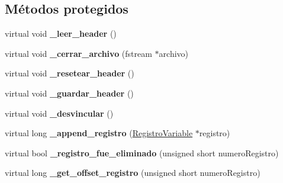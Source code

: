 \subsection*{\-Métodos protegidos}
\begin{DoxyCompactItemize}
\item 
\hypertarget{class_manejador_registros_variables_ac60f3d3598c66d062b872c2fea30bc29}{virtual void {\bfseries \-\_\-leer\-\_\-header} ()}\label{class_manejador_registros_variables_ac60f3d3598c66d062b872c2fea30bc29}

\item 
\hypertarget{class_manejador_registros_variables_a172152a530dbae43af2d83aa8cbdaa88}{virtual void {\bfseries \-\_\-cerrar\-\_\-archivo} (fstream $\ast$archivo)}\label{class_manejador_registros_variables_a172152a530dbae43af2d83aa8cbdaa88}

\item 
\hypertarget{class_manejador_registros_variables_a2ba9a32df31b43fbdf821921c27b9459}{virtual void {\bfseries \-\_\-resetear\-\_\-header} ()}\label{class_manejador_registros_variables_a2ba9a32df31b43fbdf821921c27b9459}

\item 
\hypertarget{class_manejador_registros_variables_a8022d09ab67fe22c33412bedd87abb6b}{virtual void {\bfseries \-\_\-guardar\-\_\-header} ()}\label{class_manejador_registros_variables_a8022d09ab67fe22c33412bedd87abb6b}

\item 
\hypertarget{class_manejador_registros_variables_a9ae9fd765ad7304c1ab6d81d2893af40}{virtual void {\bfseries \-\_\-desvincular} ()}\label{class_manejador_registros_variables_a9ae9fd765ad7304c1ab6d81d2893af40}

\item 
\hypertarget{class_manejador_registros_variables_afc825aac9890000348275322d2981a75}{virtual long {\bfseries \-\_\-append\-\_\-registro} (\hyperlink{class_registro_variable}{\-Registro\-Variable} $\ast$registro)}\label{class_manejador_registros_variables_afc825aac9890000348275322d2981a75}

\item 
\hypertarget{class_manejador_registros_variables_a82970185df65cba78ea3124f93d17c50}{virtual bool {\bfseries \-\_\-registro\-\_\-fue\-\_\-eliminado} (unsigned short numero\-Registro)}\label{class_manejador_registros_variables_a82970185df65cba78ea3124f93d17c50}

\item 
\hypertarget{class_manejador_registros_variables_af65de9d0bb00a37a326499890dbc5b1a}{virtual long {\bfseries \-\_\-get\-\_\-offset\-\_\-registro} (unsigned short numero\-Registro)}\label{class_manejador_registros_variables_af65de9d0bb00a37a326499890dbc5b1a}


\end{DoxyCompactItemize}
